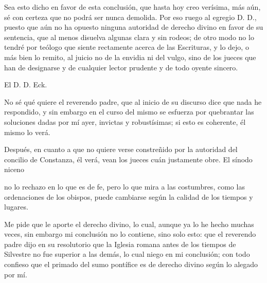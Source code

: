 Sea esto dicho en favor de esta conclusión, que hasta hoy creo verísima, más aún, sé con certeza que no podrá ser nunca demolida. Por eso ruego al egregio D. D., puesto que aún no ha opuesto ninguna autoridad de derecho divino en favor de su sentencia, que al menos disuelva algunas clara y sin rodeos; de otro modo no lo tendré por teólogo que siente rectamente acerca de las Escrituras, y lo dejo, o más bien lo remito, al juicio no de la envidia ni del vulgo, sino de los jueces que han de designarse y de cualquier lector prudente y de todo oyente sincero.

El D. D. Eck.

No sé qué quiere el reverendo padre, que al inicio de su discurso dice que nada he respondido, y sin embargo en el curso del mismo se esfuerza por quebrantar las soluciones dadas por mí ayer, invictas y robustísimas; si esto es coherente, él mismo lo verá.

Después, en cuanto a que no quiere verse constreñido por la autoridad del concilio de Constanza, él verá, vean los jueces cuán justamente obre. El sínodo niceno

no lo rechazo en lo que es de fe, pero lo que mira a las costumbres, como las ordenaciones de los obispos, puede cambiarse según la calidad de los tiempos y lugares.

Me pide que le aporte el derecho divino, lo cual, aunque ya lo he hecho muchas veces, sin embargo mi conclusión no lo contiene, sino solo esto: que el reverendo padre dijo en su resolutorio que la Iglesia romana antes de los tiempos de Silvestre no fue superior a las demás, lo cual niego en mi conclusión; con todo confieso que el primado del sumo pontífice es de derecho divino según lo alegado por mí.

